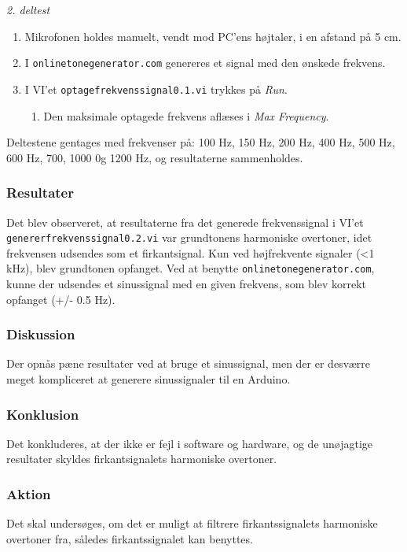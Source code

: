 			
			\textit{2. deltest}			
			\begin{enumerate}
				\item Mikrofonen holdes manuelt, vendt mod PC'ens højtaler, i en afstand på 5 cm. 
				\item I \texttt{onlinetonegenerator.com} genereres et signal med den ønskede frekvens. 
				\item I VI'et \texttt{optagefrekvenssignal0.1.vi} trykkes på \textit{Run}. 
					\begin{enumerate}
						\item Den maksimale optagede frekvens aflæses i \textit{Max Frequency}. 
					\end{enumerate}	  
			\end{enumerate}
		
			Deltestene gentages med frekvenser på: 100 Hz, 150 Hz, 200 Hz, 400 Hz, 500 Hz, 600 Hz, 700, 1000 0g 1200 Hz, og resultaterne sammenholdes. 
			
			\subsubsection{Resultater}
			 Det blev observeret, at resultaterne fra det generede frekvenssignal i VI'et \texttt{genererfrekvenssignal0.2.vi} var grundtonens harmoniske overtoner, idet frekvensen udsendes som et firkantsignal. Kun ved højfrekvente signaler (<1 kHz), blev grundtonen opfanget. 
			 Ved at benytte \texttt{onlinetonegenerator.com}, kunne der udsendes et sinussignal med en given frekvens, som blev korrekt opfanget (+/- 0.5 Hz).     
			\subsubsection{Diskussion}
			Der opnås pæne resultater ved at bruge et sinussignal, men der er desværre meget kompliceret at generere sinussignaler til en Arduino.   
			\subsubsection{Konklusion}
			Det konkluderes, at der ikke er fejl i software og hardware, og de unøjagtige resultater skyldes firkantsignalets harmoniske overtoner.  
			\subsubsection{Aktion}
			Det skal undersøges, om det er muligt at filtrere firkantssignalets harmoniske overtoner fra, således firkantssignalet kan benyttes. 
		
